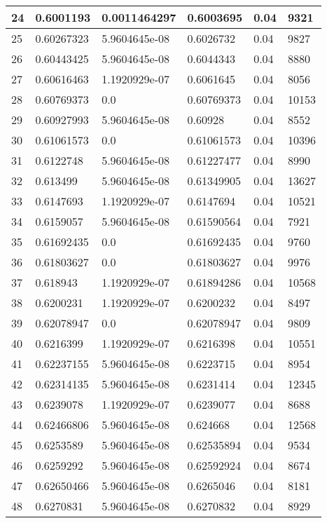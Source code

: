 \begin{longtable}{|l|l|l|l|l|l|}
24 & 0.6001193 & 0.0011464297 & 0.6003695 & 0.04 & 9321 \\ \hline 
25 & 0.60267323 & 5.9604645e-08 & 0.6026732 & 0.04 & 9827 \\ \hline 
26 & 0.60443425 & 5.9604645e-08 & 0.6044343 & 0.04 & 8880 \\ \hline 
27 & 0.60616463 & 1.1920929e-07 & 0.6061645 & 0.04 & 8056 \\ \hline 
28 & 0.60769373 & 0.0 & 0.60769373 & 0.04 & 10153 \\ \hline 
29 & 0.60927993 & 5.9604645e-08 & 0.60928 & 0.04 & 8552 \\ \hline 
30 & 0.61061573 & 0.0 & 0.61061573 & 0.04 & 10396 \\ \hline 
31 & 0.6122748 & 5.9604645e-08 & 0.61227477 & 0.04 & 8990 \\ \hline 
32 & 0.613499 & 5.9604645e-08 & 0.61349905 & 0.04 & 13627 \\ \hline 
33 & 0.6147693 & 1.1920929e-07 & 0.6147694 & 0.04 & 10521 \\ \hline 
34 & 0.6159057 & 5.9604645e-08 & 0.61590564 & 0.04 & 7921 \\ \hline 
35 & 0.61692435 & 0.0 & 0.61692435 & 0.04 & 9760 \\ \hline 
36 & 0.61803627 & 0.0 & 0.61803627 & 0.04 & 9976 \\ \hline 
37 & 0.618943 & 1.1920929e-07 & 0.61894286 & 0.04 & 10568 \\ \hline 
38 & 0.6200231 & 1.1920929e-07 & 0.6200232 & 0.04 & 8497 \\ \hline 
39 & 0.62078947 & 0.0 & 0.62078947 & 0.04 & 9809 \\ \hline 
40 & 0.6216399 & 1.1920929e-07 & 0.6216398 & 0.04 & 10551 \\ \hline 
41 & 0.62237155 & 5.9604645e-08 & 0.6223715 & 0.04 & 8954 \\ \hline 
42 & 0.62314135 & 5.9604645e-08 & 0.6231414 & 0.04 & 12345 \\ \hline 
43 & 0.6239078 & 1.1920929e-07 & 0.6239077 & 0.04 & 8688 \\ \hline 
44 & 0.62466806 & 5.9604645e-08 & 0.624668 & 0.04 & 12568 \\ \hline 
45 & 0.6253589 & 5.9604645e-08 & 0.62535894 & 0.04 & 9534 \\ \hline 
46 & 0.6259292 & 5.9604645e-08 & 0.62592924 & 0.04 & 8674 \\ \hline 
47 & 0.62650466 & 5.9604645e-08 & 0.6265046 & 0.04 & 8181 \\ \hline 
48 & 0.6270831 & 5.9604645e-08 & 0.6270832 & 0.04 & 8929 \\ \hline 

\end{longtable}
